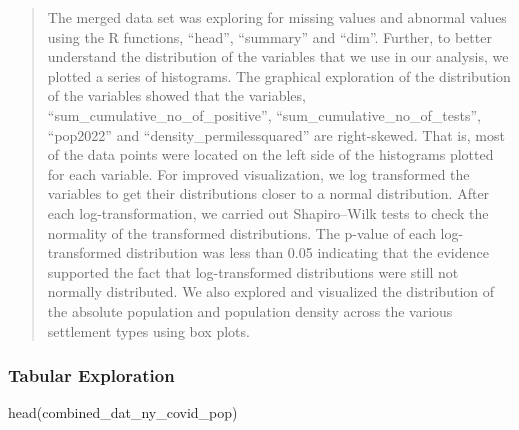 \documentclass[
  12pt,
]{article}
\newenvironment{Shaded}{\begin{snugshade}}{\end{snugshade}}
\newcommand{\FunctionTok}[1]{\textcolor[rgb]{0.00,0.00,0.00}{#1}}
\newcommand{\NormalTok}[1]{#1}
\begin{document}
\begin{quote}
The merged data set was exploring for missing values and abnormal values
using the R functions, ``head'', ``summary'' and ``dim''. Further, to
better understand the distribution of the variables that we use in our
analysis, we plotted a series of histograms. The graphical exploration
of the distribution of the variables showed that the variables,
``sum\_cumulative\_no\_of\_positive'',
``sum\_cumulative\_no\_of\_tests'', ``pop2022'' and
``density\_permilessquared'' are right-skewed. That is, most of the data
points were located on the left side of the histograms plotted for each
variable. For improved visualization, we log transformed the variables
to get their distributions closer to a normal distribution. After each
log-transformation, we carried out Shapiro--Wilk tests to check the
normality of the transformed distributions. The p-value of each
log-transformed distribution was less than 0.05 indicating that the
evidence supported the fact that log-transformed distributions were
still not normally distributed. We also explored and visualized the
distribution of the absolute population and population density across
the various settlement types using box plots.
\end{quote}

\hypertarget{tabular-exploration}{%
\subsubsection{Tabular Exploration}\label{tabular-exploration}}

\begin{Shaded}
\begin{Highlighting}[]
\FunctionTok{head}\NormalTok{(combined\_dat\_ny\_covid\_pop)}
\end{Highlighting}
\end{Shaded}
\end{document}
